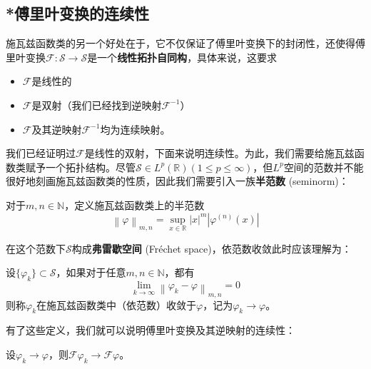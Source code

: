 \subsection{*傅里叶变换的连续性}\label{sub:fourier_continuous}
施瓦兹函数类的另一个好处在于，它不仅保证了傅里叶变换下的封闭性，还使得傅里叶变换$\mathcal{F} :\mathcal{S} \to \mathcal{S} $是一个\textbf{线性拓扑自同构}，具体来说，这要求\begin{itemize}
    \item $\mathcal{F} $是线性的
    \item $\mathcal{F} $是双射（我们已经找到逆映射$\mathcal{F} ^{-1} $）
    \item $\mathcal{F} $及其逆映射$\mathcal{F} ^{-1} $均为连续映射。
\end{itemize}
我们已经证明过$\mathcal{F}$是线性的双射，下面来说明连续性。为此，我们需要给施瓦兹函数类赋予一个拓扑结构。尽管$\mathcal{S}\in L^p(\mathbb{R} )(1\leq p\leq\infty)$，但$L^p$空间的范数并不能很好地刻画施瓦兹函数类的性质，因此我们需要引入一族\textbf{半范数} (seminorm)：
\begin{definition}[*施瓦兹函数类的半范数]
    对于$m,n\in\mathbb{N} $，定义施瓦兹函数类上的半范数
    \[\left\|\varphi\right\|_{m,n}=\sup_{x\in\mathbb{R} }|x|^m\left|\varphi^{(n)}(x)\right|\]
\end{definition}
在这个范数下$\mathcal{S} $构成\textbf{弗雷歇空间} (Fréchet space)，依范数收敛此时应该理解为：
\begin{definition}[*施瓦兹函数类中的收敛]
    设$\{\varphi_k\}\subset\mathcal{S} $，如果对于任意$m,n\in\mathbb{N} $，都有
    \[\lim_{k\to\infty}\left\|\varphi_k-\varphi\right\|_{m,n}=0\]
    则称$\varphi_k$在施瓦兹函数类中（依范数）收敛于$\varphi$，记为$\varphi_k\to \varphi$。
\end{definition}
有了这些定义，我们就可以说明傅里叶变换及其逆映射的连续性：
\begin{theorem}
    设$\varphi_k\to \varphi$，则$\mathcal{F} \varphi_k\to \mathcal{F} \varphi$。
\end{theorem}
